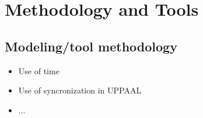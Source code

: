 \section{Methodology and Tools}
\label{sec:methodology}

\subsection{Modeling/tool methodology}

\begin{itemize}
    \item Use of time
    \item Use of syncronization in UPPAAL
    \item ...
\end{itemize}